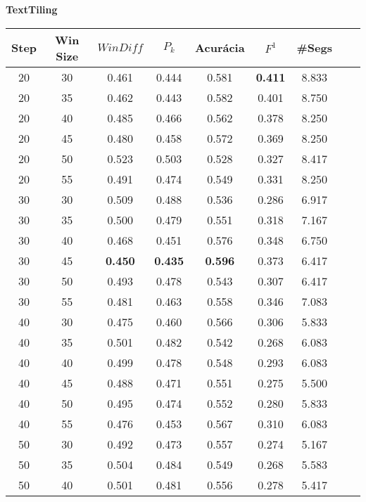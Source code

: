 \documentclass{article}
\begin{document}
 




{  
\large
\center
	\textbf{TextTiling}  

}


\begin{longtable}[c]{|c|c|c|c|c|c|c|c|c|} 
\hline 
 Step & Win Size & $WinDiff$ & $P_k$ & Acurácia & $F^1$ & \#Segs\\ \hline 
 20 & 30 & 0.461 & 0.444 & 0.581 & \cellcolor{gray!20} \textbf{0.411} & 8.833  \\ \hline 
 20 & 35 & 0.462 & 0.443 & 0.582 & 0.401 & 8.750  \\ \hline 
 20 & 40 & 0.485 & 0.466 & 0.562 & 0.378 & 8.250  \\ \hline 
 20 & 45 & 0.480 & 0.458 & 0.572 & 0.369 & 8.250  \\ \hline 
 20 & 50 & 0.523 & 0.503 & 0.528 & 0.327 & 8.417  \\ \hline 
 20 & 55 & 0.491 & 0.474 & 0.549 & 0.331 & 8.250  \\ \hline 
 30 & 30 & 0.509 & 0.488 & 0.536 & 0.286 & 6.917  \\ \hline 
 30 & 35 & 0.500 & 0.479 & 0.551 & 0.318 & 7.167  \\ \hline 
 30 & 40 & 0.468 & 0.451 & 0.576 & 0.348 & 6.750  \\ \hline 
 30 & 45 & \cellcolor{gray!20} \textbf{0.450} & \cellcolor{gray!20} \textbf{0.435} & \cellcolor{gray!20} \textbf{0.596} & 0.373 & 6.417  \\ \hline 
 30 & 50 & 0.493 & 0.478 & 0.543 & 0.307 & 6.417  \\ \hline 
 30 & 55 & 0.481 & 0.463 & 0.558 & 0.346 & 7.083  \\ \hline 
 40 & 30 & 0.475 & 0.460 & 0.566 & 0.306 & 5.833  \\ \hline 
 40 & 35 & 0.501 & 0.482 & 0.542 & 0.268 & 6.083  \\ \hline 
 40 & 40 & 0.499 & 0.478 & 0.548 & 0.293 & 6.083  \\ \hline 
 40 & 45 & 0.488 & 0.471 & 0.551 & 0.275 & 5.500  \\ \hline 
 40 & 50 & 0.495 & 0.474 & 0.552 & 0.280 & 5.833  \\ \hline 
 40 & 55 & 0.476 & 0.453 & 0.567 & 0.310 & 6.083  \\ \hline 
 50 & 30 & 0.492 & 0.473 & 0.557 & 0.274 & 5.167  \\ \hline 
 50 & 35 & 0.504 & 0.484 & 0.549 & 0.268 & 5.583  \\ \hline 
 50 & 40 & 0.501 & 0.481 & 0.556 & 0.278 & 5.417  \\ \hline 

\end{longtable}
\end{document}
